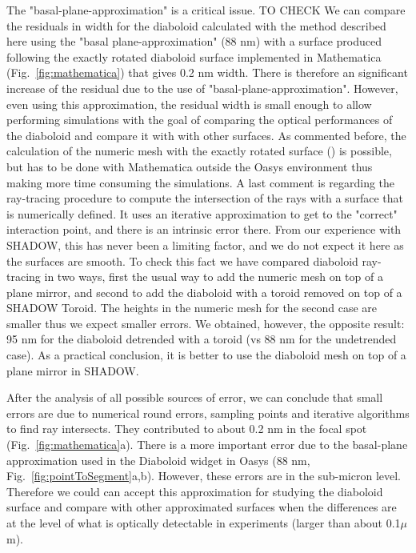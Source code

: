 \documentclass{iucr}              %
\newcommand{\inred}[1]{{\color{red}#1}}
\begin{document}
The "basal-plane-approximation" is a critical issue. \inred{TO CHECK We can compare the residuals in width for the diaboloid calculated with the method described here using the "basal plane-approximation" (88 nm) with a surface produced following the exactly rotated diaboloid surface \cite{Valeriy2020b} implemented in Mathematica \cite{lacey}  (Fig.~\ref{fig:mathematica}) that gives 0.2 nm width. There is therefore an significant increase of the residual due to the use of "basal-plane-approximation". However, even using this approximation, the residual width is small enough to allow performing simulations with the goal of comparing the optical performances of the diaboloid and compare it with with other surfaces. As commented before, the calculation of the numeric mesh with the exactly rotated surface (\cite{Valeriy2020b}) is possible, but has to be done with Mathematica outside the Oasys environment thus making more time consuming the simulations.}  A last comment is regarding the ray-tracing procedure to compute the intersection of the rays with a surface that is numerically defined. It uses an iterative approximation to get to the "correct" interaction point, and there is an intrinsic error there. From our experience with SHADOW, this has never been a limiting factor, and we do not expect it here as the surfaces are smooth. To check this fact we have compared  diaboloid ray-tracing in two ways, first the usual way to add the numeric mesh on top of a plane mirror, and second to add the diaboloid with a toroid removed on top of a SHADOW Toroid. The heights in the numeric mesh for the second case are smaller thus we expect smaller errors. We obtained, however, the opposite result: 95 nm for the diaboloid detrended with a toroid (vs 88 nm for the undetrended case). As a practical conclusion, it is better to use the diaboloid mesh on top of a plane mirror in SHADOW.

After the analysis of all possible sources of error, we can conclude that small errors are due to numerical round errors, sampling points and iterative algorithms to find ray intersects. They contributed to about 0.2 nm in the focal spot (Fig.~\ref{fig:mathematica}a). There is a more important error due to the basal-plane approximation used in the Diaboloid widget in Oasys (88 nm, Fig.~\ref{fig:pointToSegment}a,b). However, these errors are in the sub-micron level. Therefore we could can accept this approximation for studying the diaboloid surface and compare with other approximated surfaces when the differences are at the level of what is optically detectable in experiments (larger than about 0.1$\mu$m).
\end{document}

